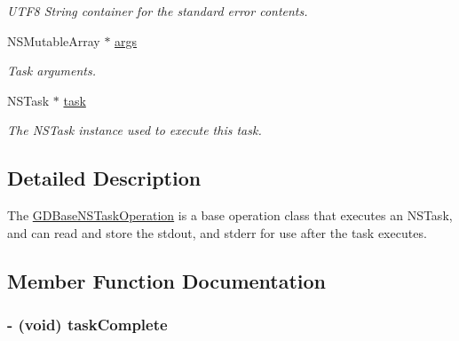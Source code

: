 \begin{DoxyCompactItemize}
\begin{DoxyCompactList}\small\item\em UTF8 String container for the standard error contents. \item\end{DoxyCompactList}\item 
\hypertarget{interface_g_d_base_n_s_task_operation_aeff37228f09ccb97d76f5ff2b5c24b25}{
NSMutableArray $\ast$ \hyperlink{interface_g_d_base_n_s_task_operation_aeff37228f09ccb97d76f5ff2b5c24b25}{args}}
\label{interface_g_d_base_n_s_task_operation_aeff37228f09ccb97d76f5ff2b5c24b25}

\begin{DoxyCompactList}\small\item\em Task arguments. \item\end{DoxyCompactList}\item 
\hypertarget{interface_g_d_base_n_s_task_operation_a5690c4baddbbea9f0d998be626746251}{
NSTask $\ast$ \hyperlink{interface_g_d_base_n_s_task_operation_a5690c4baddbbea9f0d998be626746251}{task}}
\label{interface_g_d_base_n_s_task_operation_a5690c4baddbbea9f0d998be626746251}

\begin{DoxyCompactList}\small\item\em The NSTask instance used to execute this task. \item\end{DoxyCompactList}\end{DoxyCompactItemize}


\subsection{Detailed Description}
The \hyperlink{interface_g_d_base_n_s_task_operation}{GDBaseNSTaskOperation} is a base operation class that executes an NSTask, and can read and store the stdout, and stderr for use after the task executes. 

\subsection{Member Function Documentation}
\hypertarget{interface_g_d_base_n_s_task_operation_acd63f4b69b6774566cee0b95ffc1c71a}{
\subsubsection[{taskComplete}]{\setlength{\rightskip}{0pt plus 5cm}-\/ (void) taskComplete }}
\label{interface_g_d_base_n_s_task_operation_acd63f4b69b6774566cee0b95ffc1c71a}


